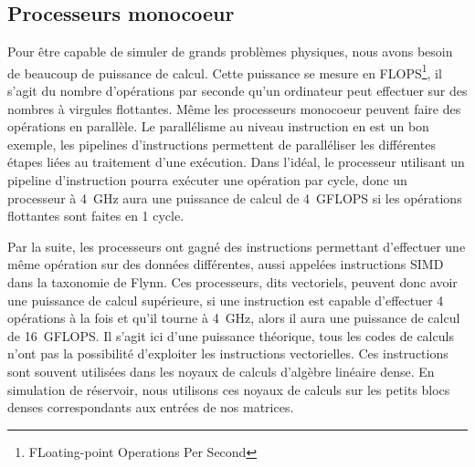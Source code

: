 \subsection{Processeurs monocoeur}
Pour être capable de simuler de grands problèmes physiques, nous avons besoin de beaucoup de puissance de calcul.
%
Cette puissance se mesure en FLOPS\footnote{FLoating-point Operations Per Second}, il s'agit du nombre d'opérations par seconde qu'un ordinateur peut effectuer sur des nombres à virgules flottantes.
%
Même les processeurs monocoeur peuvent faire des opérations en parallèle.
%
Le parallélisme au niveau instruction en est un bon exemple, les pipelines d'instructions permettent de paralléliser les différentes étapes liées au traitement d'une exécution.
%
Dans l'idéal, le processeur utilisant un pipeline d'instruction pourra exécuter une opération par cycle, donc un processeur à 4~GHz aura une puissance de calcul de 4~GFLOPS si les opérations flottantes sont faites en 1 cycle.


Par la suite, les processeurs ont gagné des instructions permettant d'effectuer une même opération sur des données différentes, aussi appelées instructions SIMD dans la taxonomie de Flynn.
%
Ces processeurs, dits vectoriels, peuvent donc avoir une puissance de calcul supérieure, si une instruction est capable d'effectuer 4 opérations à la fois et qu'il tourne à 4~GHz, alors il aura une puissance de calcul de 16~GFLOPS.
%
Il s'agit ici d'une puissance théorique, tous les codes de calculs n'ont pas la possibilité d'exploiter les instructions vectorielles.
%
Ces instructions sont souvent utilisées dans les noyaux de calculs d'algèbre linéaire dense.
%
En simulation de réservoir, nous utilisons ces noyaux de calculs sur les petits blocs denses correspondants aux entrées de nos matrices.
